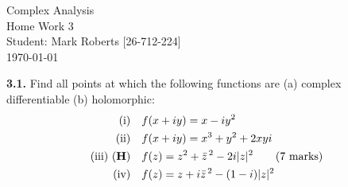 \documentclass[12pt,a4paper]{article}
\begin{document}
\begin{titlepage}
\centering
\vspace*{\fill} %

{\Huge Complex Analysis} \\[0.5cm] %
{\Huge Home Work 3}\\[1.5cm] %
{\Large Student: Mark Roberts [26-712-224]}\\[0.5cm] %
{\Large \today} %

\vspace*{\fill}
\end{titlepage}
\newpage

\noindent\textbf{3.1.} Find all points at which the following functions are (a) complex differentiable (b) holomorphic:
\begin{align*}
\text{(i)}\quad &f(x+iy)=x-iy^2\\
\text{(ii)}\quad &f(x+iy)=x^3+y^2+2xyi\\
\text{(iii) (\textbf{H})}\quad &f(z)=z^2+\bar{z}^{\,2}-2i|z|^2 \qquad \text{(7 marks)}\\
\text{(iv)}\quad &f(z)=z+i\bar{z}^{\,2}-(1-i)|z|^2
\end{align*}

\vspace{1cm}
\end{document}
